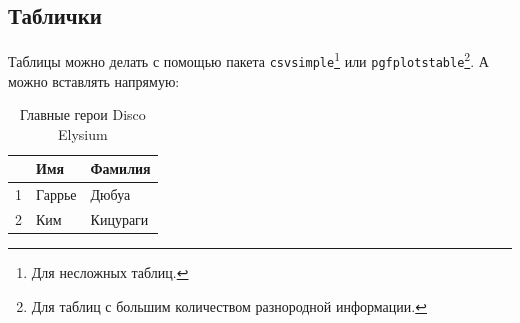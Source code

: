 \textcolor{gray}{}


\subsection{Таблички}

Таблицы можно делать с помощью пакета \texttt{csvsimple}\footnote{Для несложных таблиц.} или \texttt{pgfplotstable}\footnote{Для таблиц с большим количеством разнородной информации.}. А можно вставлять напрямую:

\begin{table}[h!]
    \centering
    \begin{tabular}{|c|l|l|} \hline
        & \textbf{Имя} & \textbf{Фамилия} \\ \hline
        1 & Гаррье & Дюбуа \\ \hline
        2 & Ким & Кицураги \\ \hline
    \end{tabular}
    \caption{Главные герои Disco Elysium}
    \label{table:disco_main_characters}
\end{table}